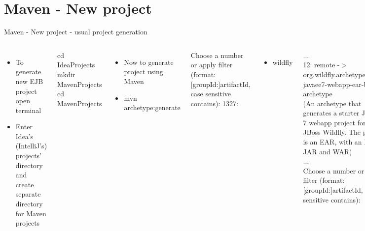 \documentclass[aspectratio=1610,english]{beamer} %
\begin{document}
  	\section{Maven - New project}
	\begin{frame}{Maven - New project - usual project generation}
		\begin{columns}
				\begin{itemize}
					\tiny
					\color{black}
					\item To generate new EJB project open terminal
					\item Enter Idea's (IntelliJ's) projects' directory \\
						and create separate directory for Maven projects 
				\end{itemize}
				\fontsize{4}{5} \selectfont
				cd IdeaProjects \\
				mkdir MavenProjects \\
				cd MavenProjects
				
				\begin{itemize}
					\tiny
					\color{black}
					\item Now to generate project using Maven
					\item mvn archetype:generate 
				\end{itemize}
				\fontsize{4}{5} \selectfont
				Choose a number or apply filter (format: [groupId:]artifactId, \\
					case sensitive contains): 1327: 
					
				\begin{itemize}
					\tiny
					\color{black}
					\item wildfly
				\end{itemize}
				\fontsize{4}{5} \selectfont
				... \\
				12: remote -$>$ \\ 
				org.wildfly.archetype:wildfly-javaee7-webapp-ear-blank-archetype \\ 
				(An archetype that generates a starter Java EE 7 webapp project for \\ 
				JBoss Wildfly. The project is an EAR, with an EJB-JAR and WAR) \\
				... \\
				Choose a number or apply filter (format: [groupId:]artifactId, case sensitive contains):
				\begin{itemize}
					\tiny
					\color{black}
					\item 12
				\end{itemize}
				\fontsize{4}{5} \selectfont
				Choose org.wildfly.archetype:wildfly-javaee7-webapp-ear-blank-archetype version: \\
				1: 8.1.0.Final \\
				2: 8.2.0.Final \\
				Choose a number: 2: 
				

\end{columns}
\end{frame}
\end{document}
